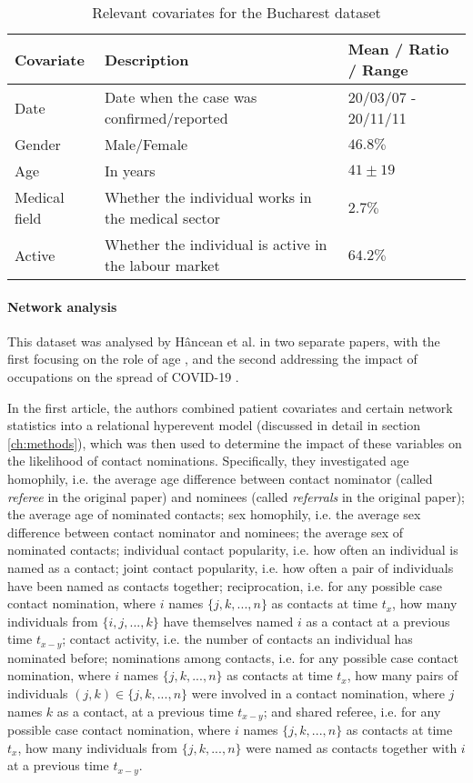\begin{table}
	\begin{tabularx}{\linewidth}{XXX}
		\hline
		\textbf{Covariate} & \textbf{Description} & \textbf{Mean / Ratio / Range}\\
		\hline
		Date & Date when the case was confirmed/reported & 20/03/07 - 20/11/11\\
		Gender & Male/Female & $46.8\%$ \\
		Age & In years & $41\pm19$ \\
		Medical field & Whether the individual works in the medical sector & $2.7\%$ \\
		Active & Whether the individual is active in the labour market & $64.2\%$ \\
		\hline
	\end{tabularx}
	\caption{Relevant covariates for the Bucharest dataset}
	\label{tab:bucharest_covariates}
\end{table}

\paragraph{Network analysis} This dataset was analysed by H\^ancean et al. in two separate papers, with the first focusing on the role of age \cite{hancean2021role}, and the second addressing the impact of occupations on the spread of COVID-19 \cite{hancean2022occupations}.

\bigskip

In the first article, the authors combined patient covariates and certain network statistics into a relational hyperevent model (discussed in detail in section \ref{ch:methods}), which was then used to determine the impact of these variables on the likelihood of contact nominations. Specifically, they investigated age homophily, i.e. the average age difference between contact nominator (called \emph{referee} in the original paper) and nominees (called \emph{referrals} in the original paper); the average age of nominated contacts; sex homophily, i.e. the average sex difference between contact nominator and nominees; the average sex of nominated contacts; individual contact popularity, i.e. how often an individual is named as a contact; joint contact popularity, i.e. how often a pair of individuals have been named as contacts together; reciprocation, i.e. for any possible case contact nomination, where $i$ names $\{j,k,...,n\}$ as contacts at time $t_x$, how many individuals from $\{i,j,...,k\}$ have themselves named $i$ as a contact at a previous time $t_{x-y}$; contact activity, i.e. the number of contacts an individual has nominated before; nominations among contacts, i.e. for any possible case contact nomination, where $i$ names $\{j,k,...,n\}$ as contacts at time $t_x$, how many pairs of individuals $(j,k) \in \{j,k,...,n\}$ were involved in a contact nomination, where $j$ names $k$ as a contact, at a previous time $t_{x-y}$; and shared referee, i.e. for any possible case contact nomination, where $i$ names $\{j,k,...,n\}$ as contacts at time $t_x$, how many individuals from $\{j,k,...,n\}$ were named as contacts together with $i$ at a previous time $t_{x-y}$.


